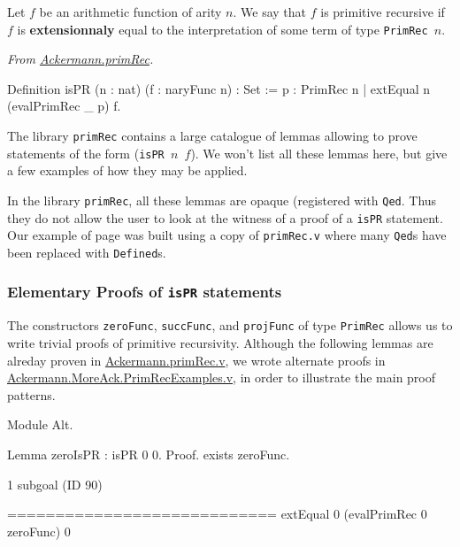 Let $f$ be an arithmetic function of arity $n$. We say that $f$ is primitive recursive if $f$ is \textbf{extensionnaly}
equal to the interpretation of some term of type \texttt{PrimRec $n$}. 

\vspace{4pt}
\noindent
\emph{From \href{../theories/html/hydras.Ackermann.primRec.html}{Ackermann.primRec}.}
\begin{Coqsrc}
Definition isPR (n : nat) (f : naryFunc n) : Set :=
  {p : PrimRec n | extEqual n (evalPrimRec _ p) f}.  
\end{Coqsrc}

The library \texttt{primRec} contains a large catalogue of lemmas allowing to prove statements 
of the form (\texttt{isPR $n$ $f$}). We won't list all these lemmas here, but give a few examples of
how they may be applied.

\begin{remark}
In the library \texttt{primRec}, all these lemmas are opaque (registered with \texttt{Qed}. Thus they do not allow the user to look at the witness of a proof of a \texttt{isPR} statement. Our example of page\pageref{sect:bigfac} was built using a  copy of \texttt{primRec.v} where many \texttt{Qed}s have been replaced with
\texttt{Defined}s.
\end{remark}

\subsubsection{Elementary Proofs of \texttt{isPR} statements}

The constructors \texttt{zeroFunc}, \texttt{succFunc},  and \texttt{projFunc} of type
\texttt{PrimRec} allows us to write trivial proofs of primitive recursivity. 
Although  the following lemmas are alreday proven in 
\href{../theories/html/hydras.Ackermann.primRec.html}{Ackermann.primRec.v},
we wrote alternate proofs in 
\href{../theories/html/hydras.Ackermann.MoreAck.PrimRecExamples.html}%
{Ackermann.MoreAck.PrimRecExamples.v}, in order to illustrate the main proof patterns.

\begin{Coqsrc}
Module Alt.
  
Lemma zeroIsPR : isPR 0 0.
Proof.
  exists zeroFunc.
\end{Coqsrc}

\begin{Coqanswer}
1 subgoal (ID 90)
  
  ============================
  extEqual 0 (evalPrimRec 0 zeroFunc) 0
\end{Coqanswer}

